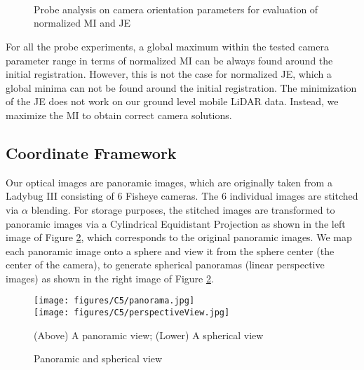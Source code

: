 \begin{figure}[H]
\centering
{} 
 \\
 \\
 \\
\caption{Probe analysis on camera orientation parameters 
for evaluation of normalized MI and JE} 
\label{fig:normalizedMIJE_O}
\end{figure}

For all the probe experiments, a global maximum within the tested camera parameter range in terms of normalized MI can be always found around the initial registration. However, this is not the case for normalized JE, which a global minima can not be found around the initial registration. The minimization of the JE does not work on our ground level mobile LiDAR data. Instead, we maximize the MI to obtain correct camera solutions. 

\subsection{Coordinate Framework}

Our optical images are panoramic images, which are originally taken from a Ladybug III consisting of 6 Fisheye cameras. The 6 individual images are  stitched via $\alpha$ blending. For storage purposes, the stitched 
images are transformed to panoramic images via a Cylindrical Equidistant Projection as shown in the left image of Figure \ref{fig:PSView}, which corresponds to the original panoramic images. We map each panoramic image onto a sphere and view it from the sphere center (the center of the camera), to generate spherical panoramas (linear perspective images) as shown in the right image of Figure \ref{fig:PSView}. 

\begin{figure}[H]
\centering
\texttt{[image: figures/C5/panorama.jpg]}\\ 
\texttt{[image: figures/C5/perspectiveView.jpg]} \\
\caption{Panoramic and spherical view} {(Above) A panoramic view; (Lower) A spherical view}
\label{fig:PSView}
\end{figure}

